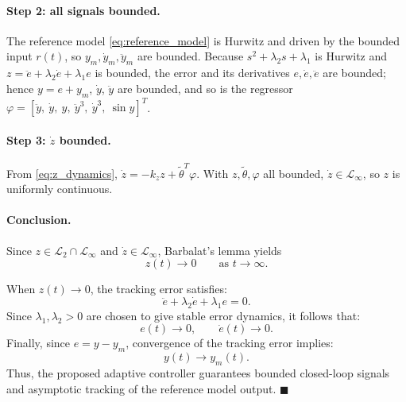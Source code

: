 \paragraph{Step 2: all signals bounded.} The reference model \eqref{eq:reference_model}
is Hurwitz and driven by the bounded input $r(t)$, so $y_m,\dot y_m,\ddot y_m$ are
bounded. Because $s^2+\lambda_2 s+\lambda_1$ is Hurwitz and
$z=\ddot e+\lambda_2\dot e+\lambda_1 e$ is bounded, the error and its derivatives
$e,\dot e,\ddot e$ are bounded; hence $y=e+y_m$, $\dot y$, $\ddot y$ are bounded,
and so is the regressor $\varphi=[\ddot y,\ \dot y,\ y,\ \ddot y^{3},\ \dot y^{3},\ \sin y]^{T}$.

\paragraph{Step 3: $\dot z$ bounded.} From \eqref{eq:z_dynamics},
$\dot z=-k_z z+\tilde\theta^{T}\varphi$. With $z,\tilde\theta,\varphi$ all bounded,
$\dot z\in\mathcal{L}_\infty$, so $z$ is uniformly continuous.

\paragraph{Conclusion.} Since $z\in\mathcal{L}_2\cap\mathcal{L}_\infty$ and
$\dot z\in\mathcal{L}_\infty$, Barbalat's lemma yields
\begin{equation}
z(t)\to 0 \qquad\text{as } t\to\infty .
\end{equation}

When \(z(t)\rightarrow0\), the tracking error satisfies:
\begin{equation}
\ddot{e}
+
\lambda_2\dot{e}
+
\lambda_1e
=
0.
\end{equation}
 Since \(\lambda_1,\lambda_2>0\) are chosen to give stable error dynamics, it follows that:
\begin{equation}
e(t)\rightarrow0,
\qquad
\dot{e}(t)\rightarrow0.
\end{equation}
Finally, since \(e=y-y_m\), convergence of the tracking error implies:
\begin{equation}
y(t)\rightarrow y_m(t).
\end{equation}
Thus, the proposed adaptive controller guarantees bounded closed-loop signals and asymptotic tracking of the reference model output. $\blacksquare$

\bigskip
